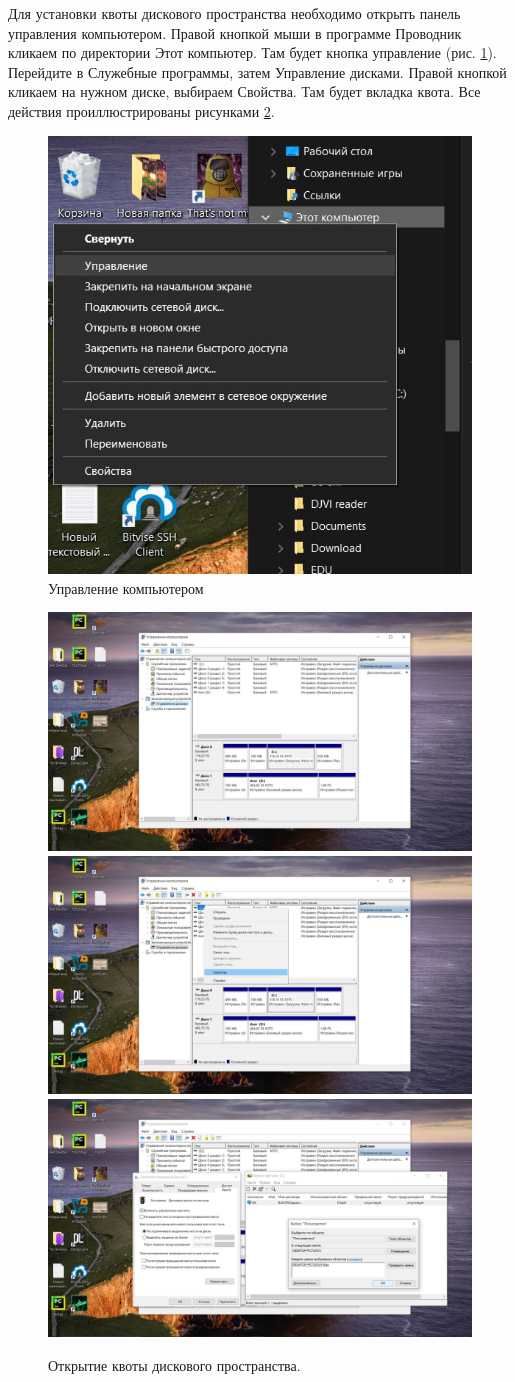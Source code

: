 Для установки квоты дискового пространства необходимо открыть панель управления компьютером. Правой кнопкой мыши в программе Проводник кликаем по директории Этот компьютер. Там будет кнопка управление (рис. \ref{fig:CompControl}). Перейдите в Служебные программы, затем Управление дисками.
Правой кнопкой кликаем на нужном диске, выбираем Свойства. Там будет вкладка квота. Все действия проиллюстрированы рисунками \ref{fig:start}.
\begin{figure}[h!]
    \centering
    \includegraphics[width=0.5\linewidth]{Pic/lab2/photo_2025-05-21_21-18-56.jpg}
    \caption{Управление компьютером}
    \label{fig:CompControl}
\end{figure}

\begin{figure}[h!]
    \centering
    \includegraphics[width=0.3\linewidth]{Pic/lab2/photo_2025-05-21_21-18-57.jpg}
    \includegraphics[width=0.3\linewidth]{Pic/lab2/photo_2025-05-21_21-18-59.jpg}
    \includegraphics[width=0.3\linewidth]{Pic/lab2/photo_2025-05-21_21-19-00.jpg}
    \caption{Открытие квоты дискового пространства.}
    \label{fig:start}
\end{figure}

